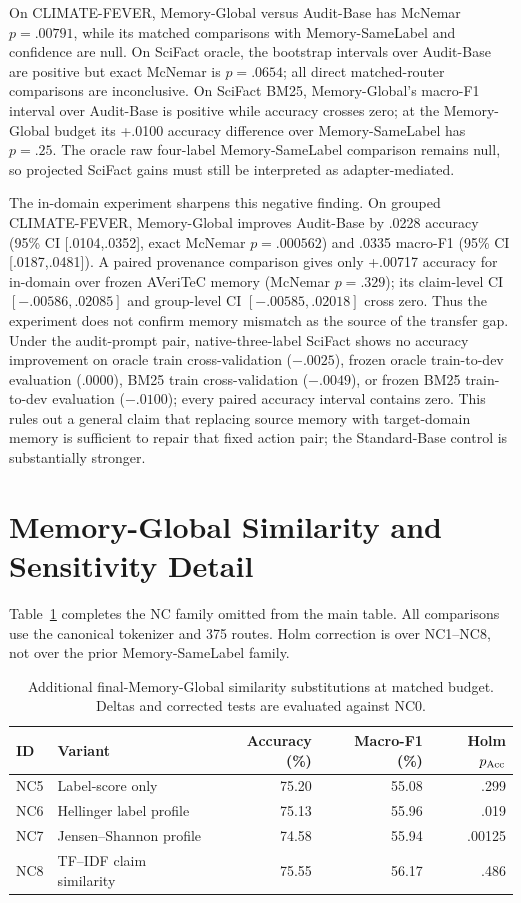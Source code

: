 \documentclass[runningheads]{llncs}
\begin{document}
On CLIMATE-FEVER, Memory-Global versus Audit-Base has McNemar $p=.00791$, while its matched
comparisons with Memory-SameLabel and confidence are null. On SciFact oracle, the
bootstrap intervals over Audit-Base are positive but exact McNemar is $p=.0654$; all
direct matched-router comparisons are inconclusive. On SciFact BM25, Memory-Global's
macro-F1 interval over Audit-Base is positive while accuracy crosses zero; at the Memory-Global
budget its +.0100 accuracy difference over Memory-SameLabel has $p=.25$. The oracle
raw four-label Memory-SameLabel comparison remains null, so projected SciFact gains
must still be interpreted as adapter-mediated.

The in-domain experiment sharpens this negative finding. On grouped
CLIMATE-FEVER, Memory-Global improves Audit-Base by .0228 accuracy
(95\% CI [.0104,.0352], exact McNemar $p=.000562$) and .0335 macro-F1
(95\% CI [.0187,.0481]). A paired provenance comparison gives only +.00717
accuracy for in-domain over frozen AVeriTeC memory (McNemar $p=.329$); its
claim-level CI $[-.00586,.02085]$ and group-level CI
$[-.00585,.02018]$ cross zero. Thus the experiment does not confirm memory
mismatch as the source of the transfer gap. Under the audit-prompt pair,
native-three-label SciFact shows no accuracy improvement on oracle train cross-validation ($-.0025$), frozen
oracle train-to-dev evaluation (.0000), BM25 train cross-validation
($-.0049$), or frozen BM25 train-to-dev evaluation ($-.0100$); every paired
accuracy interval contains zero. This rules out a general claim that replacing
source memory with target-domain memory is sufficient to repair that fixed
action pair; the Standard-Base control is substantially stronger.

\section{Memory-Global Similarity and Sensitivity Detail}

Table~\ref{tab:nc-appendix} completes the NC family omitted from the main
table. All comparisons use the canonical tokenizer and 375 routes. Holm
correction is over NC1--NC8, not over the prior Memory-SameLabel family.

\begin{table}[t]
\caption{Additional final-Memory-Global similarity substitutions at matched budget.
Deltas and corrected tests are evaluated against NC0.}
\label{tab:nc-appendix}
\centering\small
\begin{tabular}{llrrr}
\toprule
ID & Variant & Accuracy (\%) & Macro-F1 (\%) & Holm $p_{\rm Acc}$ \\
\midrule
NC5 & Label-score only & 75.20 & 55.08 & .299 \\
NC6 & Hellinger label profile & 75.13 & 55.96 & .019 \\
NC7 & Jensen--Shannon profile & 74.58 & 55.94 & .00125 \\
NC8 & TF--IDF claim similarity & 75.55 & 56.17 & .486 \\
\bottomrule
\end{tabular}
\end{table}
\end{document}

